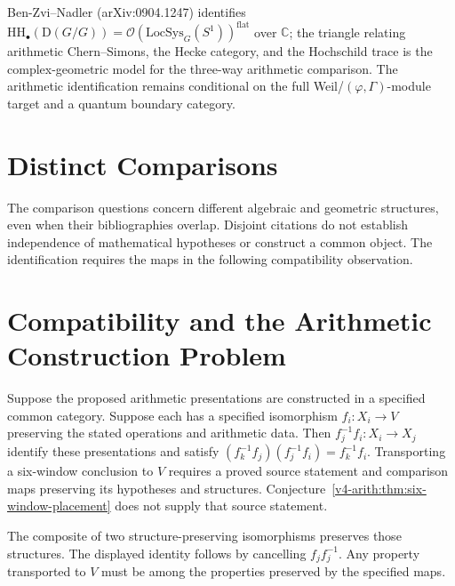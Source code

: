 Ben-Zvi--Nadler (arXiv:0904.1247) identifies
$\mathrm{HH}_{\bullet}(\mathrm{D}(G/G))=\mathcal{O}(\mathrm{LocSys}_{G}(S^{1}))^{\mathrm{flat}}$
over $\mathbb{C}$; the triangle relating arithmetic Chern--Simons,
the Hecke category, and the Hochschild trace is the
complex-geometric model for the three-way arithmetic comparison. The
arithmetic identification remains conditional on the full
Weil/$(\varphi,\Gamma)$-module target and a quantum boundary category.

\section{Distinct Comparisons}
\label{v4-arith:app:B:criterion-record}

The comparison questions concern different algebraic and geometric
structures, even when their bibliographies overlap. Disjoint citations do not establish independence of mathematical
hypotheses or construct a common object. The identification requires
the maps in the following compatibility observation.

\section{Compatibility and the Arithmetic Construction Problem}
\label{v4-arith:app:B:convergence-theorem}

\begin{remark}
\label{v4-arith:app:B:thm:obstruction-theoretic-convergence}
Suppose the proposed arithmetic presentations are constructed in a
specified common category. Suppose each has a specified isomorphism
\(f_i:X_i\to V\) preserving the stated operations and arithmetic data.
Then \(f_j^{-1}f_i:X_i\to X_j\) identify these presentations and satisfy
\((f_k^{-1}f_j)(f_j^{-1}f_i)=f_k^{-1}f_i\).
Transporting a six-window conclusion to \(V\) requires a proved
source statement and comparison maps preserving its hypotheses and
structures. Conjecture~\ref{v4-arith:thm:six-window-placement}
does not supply that source statement.
\par
The composite of two structure-preserving isomorphisms preserves
those structures. The displayed identity follows by cancelling
\(f_jf_j^{-1}\). Any property transported to \(V\) must be among
the properties preserved by the specified maps.
\end{remark}

